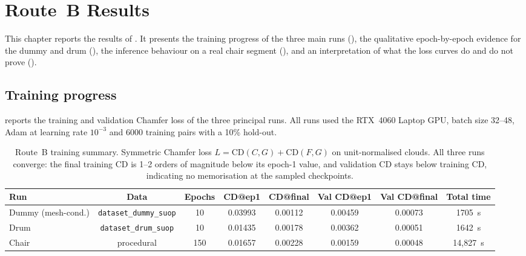 \chapter{Route~B Results}
\label{ch:resultsB}

This chapter reports the results of \routeB{}. It presents the training
progress of the three main runs (), the
qualitative epoch-by-epoch evidence for the dummy and drum
(), the inference behaviour on a real \suop{}
chair segment (), and an interpretation of what the
loss curves do and do not prove ().

\section{Training progress}
\label{sec:resultsB_training}

 reports the training and validation Chamfer loss
of the three principal runs. All runs used the RTX~4060 Laptop GPU, batch size
32--48, Adam at learning rate $10^{-3}$ and 6000 training pairs with a 10\%
hold-out.

\begin{table}[H]
  \centering
  \small
  \begin{adjustbox}{max width=\textwidth}
  \begin{tabular}{@{}lccccccc@{}}
    \toprule
    Run & Data & Epochs & CD@ep1 & CD@final & Val CD@ep1 & Val CD@final & Total time \\
    \midrule
    Dummy (mesh-cond.) & \texttt{dataset\_dummy\_suop} & 10 & 0.03993 & 0.00112 & 0.00459 & 0.00073 & 1705~s \\
    Drum & \texttt{dataset\_drum\_suop} & 10 & 0.01435 & 0.00178 & 0.00362 & 0.00051 & 1642~s \\
    Chair & procedural & 150 & 0.01657 & 0.00228 & 0.00159 & 0.00048 & 14{,}827~s \\
    \bottomrule
  \end{tabular}
  \end{adjustbox}
  \caption{Route~B training summary. Symmetric Chamfer loss $L =
  \mathrm{CD}(C,G)+\mathrm{CD}(F,G)$ on unit-normalised clouds. All three runs
  converge: the final training CD is 1--2 orders of magnitude below its
  epoch-1 value, and validation CD stays below training CD, indicating no
  memorisation at the sampled checkpoints.}
  \label{tab:routeB_training}
\end{table}

